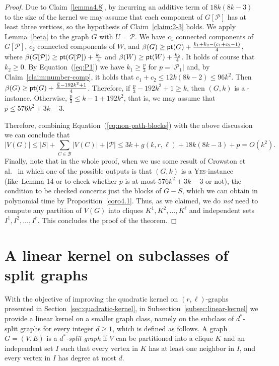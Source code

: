 \documentclass[
final
]{dmtcs-episciences}
\begin{document}
\begin{proof}
\vspace{.3cm}



 Due to Claim~\ref{lemma4.8}, by incurring an additive term of $18k(8k-3)$ to the size of the kernel we may assume that each component of $G[\mathcal{P}]$ has at least three vertices, so the hypothesis of Claim~\ref{claim:2-3} holds. We apply Lemma~\ref{beta} to the graph $G$ with $U=\mathcal{P}$. We have $c_1$ connected components of $G[\mathcal{P}]$, $c_2$ connected components of $W$, and $\beta(G)\geq {\sf pt}(G)+\frac{k_1+k_2-(c_1+c_2-1)}{4}$, where $\beta(G[\mathcal{P}])\geq {\sf pt}(G[\mathcal{P}])+\frac{k_1}{4}$ and $\beta(W)\geq {\sf pt}(W)+\frac{k_2}{4}$. It holds of course that $k_2 \geq 0$. By Equation~(\ref{eq:P1}) we have $k_1\geq \frac{p}{3}$ for $p=|\mathcal{P}_1|$ and, by Claim~\ref{claim:number-comp}, it holds that $c_1 + c_2 \leq 12k(8k-2) \leq 96k^2$. Then $\beta(G)\geq {\sf pt}(G)+\frac{\frac{p}{3}-192k^2+1}{4}$. Therefore, if $\frac{p}{3}-192k^2+1\geq k$, then  $(G,k)$ is a {}-instance. Otherwise, $\frac{p}{3}\leq k-1+192k^2$, that is, we may assume that $p\leq 576k^2+3k-3$. 



Therefore, combining Equation~(\ref{eq:non-path-blocks}) with the above discussion we can conclude that
$$
|V(G)| \leq   |S| + \sum_{C\in\mathcal{B}}{|V(C)|} + |\mathcal{P}| \leq 3k + g(k,r,\ell) + 18k(8k-3) + p = O(k^2) .
$$
Finally, note that in the whole proof, when we use some result of Crowston et al.~\cite{crowston2013maximum} in which one of the possible outputs is that $(G,k)$ is a \textsc{Yes}-instance (like~Lemma 14 or to check whether $p$ is at most $576k^2+3k-3$ or not), the condition to be checked concerns just the blocks of $G-S$, which we can obtain in polynomial time by Proposition~\ref{coro4.1}. Thus, as we claimed, we do {\sl not} need to compute any partition of $V(G)$ into cliques $K^1,K^2,\ldots,K^\ell$  and independent sets $I^1,I^2,\ldots,I^r$. This concludes the proof of the theorem.\end{proof}



\section{A linear kernel on subclasses of split graphs}
\label{sec:linear-kernel}





With the objective of improving the quadratic kernel on $(r,\ell)$-graphs presented in Section~\ref{sec:quadratic-kernel}, in Subsection~\ref{subsec:linear-kernel} we provide a linear kernel on a smaller graph class, namely on the subclass of $d^*$-split graphs for every integer $d \geq 1$, which is defined as follows. A graph $G=(V,E)$ is a \emph{$d^*$-split graph} if $V$ can be partitioned into a clique $K$ and an independent set $I$ such that every vertex in $K$ has at least one neighbor in $I$, and every vertex in $I$ has degree at most $d$.
\end{document}
